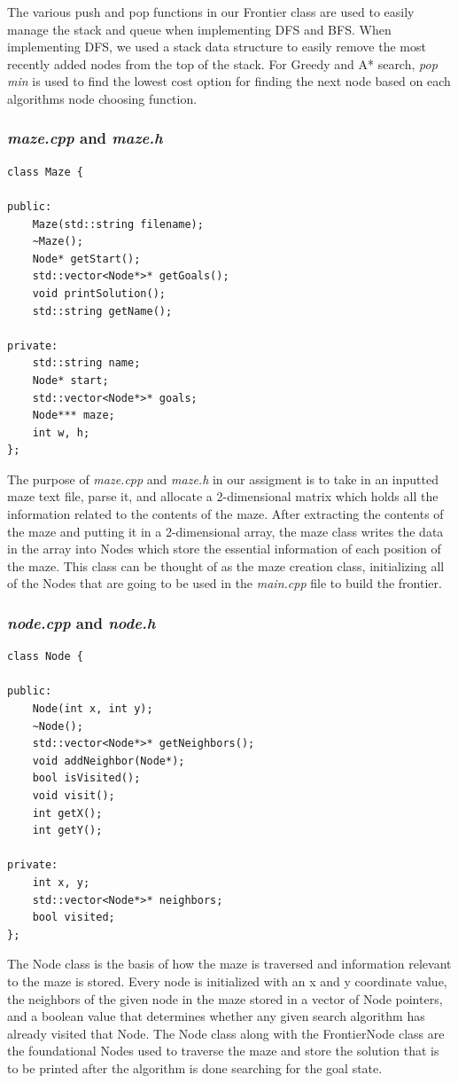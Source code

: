 \documentclass[titlepage]{article}
\begin{document}
The various push and pop functions in our Frontier class are used to easily manage the stack and queue when implementing DFS and BFS. When implementing DFS, we used a stack data structure to easily remove the most recently added nodes from the top of the stack. For Greedy and A* search, \textit{pop min} is used to find the lowest cost option for finding the next node based on each algorithms node choosing function. 

\subsubsection{\textit{maze.cpp} and \textit{maze.h}}
\begin{lstlisting}
class Maze {

public:
    Maze(std::string filename);
    ~Maze();
    Node* getStart();
    std::vector<Node*>* getGoals();
    void printSolution();
    std::string getName();

private:
    std::string name;
    Node* start;
    std::vector<Node*>* goals;
    Node*** maze;
    int w, h;
};
\end{lstlisting}

The purpose of \textit{maze.cpp} and \textit{maze.h} in our assigment is to take in an inputted maze text file, parse it, and allocate a 2-dimensional matrix which holds all the information related to the contents of the maze. After extracting the contents of the maze and putting it in a 2-dimensional array, the maze class writes the data in the array into Nodes which store the essential information of each position of the maze. This class can be thought of as the maze creation class, initializing all of the Nodes that are going to be used in the \textit{main.cpp} file to build the frontier.

\newpage

\subsubsection{\textit{node.cpp} and \textit{node.h}}
\begin{lstlisting}
class Node {

public:
    Node(int x, int y);
    ~Node();
    std::vector<Node*>* getNeighbors();
    void addNeighbor(Node*);
    bool isVisited();
    void visit();
    int getX();
    int getY();

private:
    int x, y;
    std::vector<Node*>* neighbors;
    bool visited;
};
\end{lstlisting}
The Node class is the basis of how the maze is traversed and information relevant to the maze is stored. Every node is initialized with an x and y coordinate value, the neighbors of the given node in the maze stored in a vector of Node pointers, and a boolean value that determines whether any given search algorithm has already visited that Node. The Node class along with the FrontierNode class are the foundational Nodes used to traverse the maze and store the solution that is to be printed after the algorithm is done searching for the goal state. 
\end{document}

